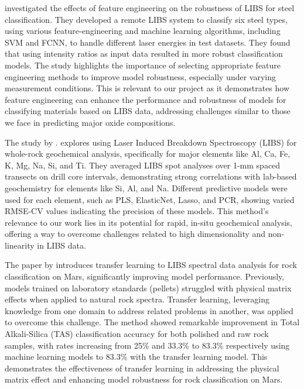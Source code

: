 \citet{jeonEffectsFeatureEngineering2024} investigated the effects of feature engineering on the robustness of LIBS for steel classification.
They developed a remote LIBS system to classify six steel types, using various feature-engineering and machine learning algorithms, including SVM and FCNN, to handle different laser energies in test datasets.
They found that using intensity ratios as input data resulted in more robust classification models.
The study highlights the importance of selecting appropriate feature engineering methods to improve model robustness, especially under varying measurement conditions.
This is relevant to our project as it demonstrates how feature engineering can enhance the performance and robustness of models for classifying materials based on LIBS data, addressing challenges similar to those we face in predicting major oxide compositions.

The study by \citet{fontanaLaserInducedBreakdown2023}.
explores using Laser Induced Breakdown Spectroscopy (LIBS) for whole-rock geochemical analysis, specifically for major elements like Al, Ca, Fe, K, Mg, Na, Si, and Ti.
They averaged LIBS spot analyses over 1-mm spaced transects on drill core intervals, demonstrating strong correlations with lab-based geochemistry for elements like Si, Al, and Na.
Different predictive models were used for each element, such as PLS, ElasticNet, Lasso, and PCR, showing varied RMSE-CV values indicating the precision of these models.
This method's relevance to our work lies in its potential for rapid, in-situ geochemical analysis, offering a way to overcome challenges related to high dimensionality and non-linearity in LIBS data.

The paper by \citet{sunMachineLearningTransfer2021} introduces transfer learning to LIBS spectral data analysis for rock classification on Mars, significantly improving model performance.
Previously, models trained on laboratory standards (pellets) struggled with physical matrix effects when applied to natural rock spectra.
Transfer learning, leveraging knowledge from one domain to address related problems in another, was applied to overcome this challenge.
The method showed remarkable improvement in Total Alkali-Silica (TAS) classification accuracy for both polished and raw rock samples, with rates increasing from 25\% and 33.3\% to 83.3\% respectively using machine learning models to 83.3\% with the transfer learning model.
This demonstrates the effectiveness of transfer learning in addressing the physical matrix effect and enhancing model robustness for rock classification on Mars.

